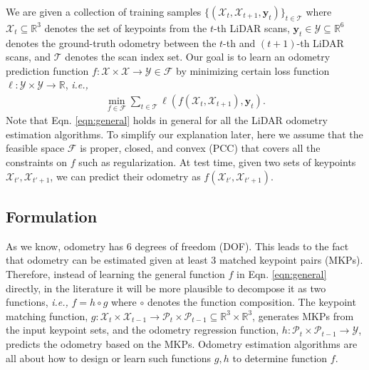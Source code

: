 \documentclass[sigconf]{acmart}
\def\ie{\emph{i.e., }}
\def\lidar{LiDAR}
\begin{document}
We are given a collection of training samples $\{(\mathcal{X}_t, \mathcal{X}_{t+1}, \mathbf{y}_{t})\}_{t\in\mathcal{T}}$ where $\mathcal{X}_t\subseteq\mathbb{R}^3$ denotes the set of keypoints from the $t$-th \lidar{} scans, $\mathbf{y}_{t}\in\mathcal{Y}\subseteq\mathbb{R}^6$ denotes the ground-truth odometry between the $t$-th and $(t+1)$-th \lidar{} scans, and $\mathcal{T}$ denotes the scan index set. Our goal is to learn an odometry prediction function $f:\mathcal{X}\times\mathcal{X}\rightarrow\mathcal{Y}\in\mathcal{F}$ by minimizing certain loss function $\ell:\mathcal{Y}\times\mathcal{Y}\rightarrow\mathbb{R}$, \ie
\begin{align}\label{eqn:general}
    \min_{f\in\mathcal{F}}\sum_{t\in\mathcal{T}}\ell(f(\mathcal{X}_t, \mathcal{X}_{t+1}), \mathbf{y}_{t}).
\end{align}
Note that Eqn. \ref{eqn:general} holds in general for all the \lidar{} odometry estimation algorithms. To simplify our explanation later, here we assume that the feasible space $\mathcal{F}$ is proper, closed, and convex (PCC) that covers all the constraints on $f$ such as regularization. At test time, given two sets of keypoints $\mathcal{X}_{t'}, \mathcal{X}_{t'+1}$, we can predict their odometry as $f(\mathcal{X}_{t'}, \mathcal{X}_{t'+1})$.


\subsection{Formulation}

As we know, odometry has 6 degrees of freedom (DOF). This leads to the fact that odometry can be estimated given at least 3 matched keypoint pairs (MKPs). Therefore, instead of learning the general function $f$ in Eqn. \ref{eqn:general} directly, in the literature it will be more plausible to decompose it as two functions, \ie $f=h\circ g$ where $\circ$ denotes the function composition. The keypoint matching function, $g:\mathcal{X}_t\times\mathcal{X}_{t-1}\rightarrow\mathcal{P}_{t}\times\mathcal{P}_{t-1}\subseteq\mathbb{R}^3\times\mathbb{R}^3$, generates MKPs from the input keypoint sets, and the odometry regression function, $h:\mathcal{P}_t\times\mathcal{P}_{t-1}\rightarrow\mathcal{Y}$, predicts the odometry based on the MKPs. Odometry estimation algorithms are all about how to design or learn such functions $g, h$ to determine function $f$.
\end{document}

